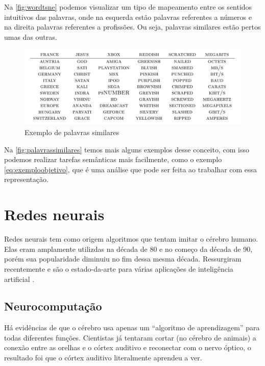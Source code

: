 Na \autoref{fig:wordtsne} podemos visualizar um tipo de mapeamento entre os sentidos intuitivos das palavras, onde na esquerda estão palavras referentes a números e na direita palavras referentes a profissões. Ou seja, palavras similares estão pertos umas das outras.

\begin{figure}[htb]
  \caption{Exemplo de palavras similares}\label{fig:palavrassimilares}
  \begin{center}
      \includegraphics[scale=0.35]{img/Colbert-WordTable2}
  \end{center}
\end{figure}

Na \autoref{fig:palavrassimilares} temos mais alguns exemplos desse conceito, com isso podemos realizar tarefas semânticas mais facilmente, como o exemplo \ref{eq:exemploobjetivo}, que é uma análise que pode ser feita ao trabalhar com essa representação.



\section{Redes neurais}\label{sec:redesneurais}

Redes neurais tem como origem algoritmos que tentam imitar o cérebro humano. Elas eram amplamente utilizdas na década de 80 e no começo da década de 90, porém sua popularidade diminuiu no fim dessa mesma década. Ressurgiram recentemente e são o estado-da-arte para várias aplicações de inteligência artificial \cite{machinelearningcoursera}.

\subsection{Neurocomputação}

Há evidências de que o cérebro usa apenas um ``algoritmo de aprendizagem'' para todas diferentes funções. Cientistas já tentaram cortar (no cérebro de animais) a conexão entre as orelhas e o córtex auditivo e reconectar com o nervo óptico, o resultado foi que o córtex auditivo literalmente aprendeu a ver. 

